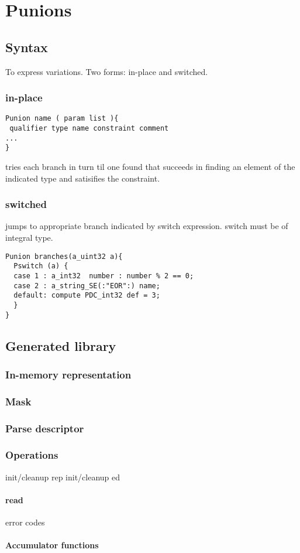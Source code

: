 \chapter{Punions}
\label{chap:unions}
\section{Syntax}
To express variations.  Two forms: in-place and switched.
\subsection{in-place}
\begin{verbatim}
Punion name ( param list ){
 qualifier type name constraint comment
...
}
\end{verbatim}
tries each branch in turn til one found that succeeds in finding an
element of the indicated type and satisifies the constraint.

\subsection{switched}
jumps to appropriate branch indicated by switch expression.
switch must be of integral type. 
\begin{verbatim}
Punion branches(a_uint32 a){
  Pswitch (a) {
  case 1 : a_int32  number : number % 2 == 0;
  case 2 : a_string_SE(:"EOR":) name;
  default: compute PDC_int32 def = 3; 
  }
}
\end{verbatim}

\section{Generated library}
\subsection{In-memory representation}
\label{sec:unions-rep}
\subsection{Mask}
\label{sec:unions-masks}
\subsection{Parse descriptor}
\label{sec:unions-parse-descriptors}
\subsection{Operations}
init/cleanup rep
init/cleanup ed
\subsubsection{read}
  error codes
\subsubsection{Accumulator functions}

